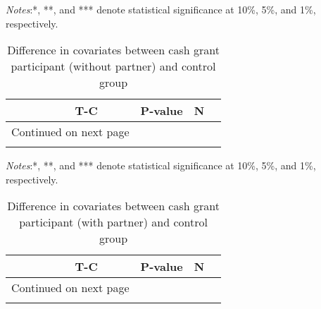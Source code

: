 \documentclass[10pt,a4paper]{article}
\begin{document}
\begin{center}
	{\tiny \tabcolsep=1pt  %
		\begin{ThreePartTable}
			\begin{TableNotes}[flushleft]
				\tiny
				\item \textit{Notes}:*, **, and *** denote statistical significance at 10\%, 5\%, and 1\%, respectively.
			\end{TableNotes}
			\begin{longtable}{l*{4}{c}}
				\caption{Difference in covariates between cash grant participant (without partner) and control group}\label{tab:balance_indiv_0}				\\
				\toprule
				\hline 
				&\multicolumn{1}{p{2cm}}{\centering T-C}
				&\multicolumn{1}{p{2cm}}{\centering P-value}
				&\multicolumn{1}{p{2cm}}{\centering N} \\
				\hline 
				\endfirsthead
				\hline
				\endhead
				\hline
				\multicolumn{2}{r}{{Continued on next page}} \\
				\endfoot
				
				\bottomrule
				\insertTableNotes
				\endlastfoot
				
			\end{longtable}
		\end{ThreePartTable}
	}
\end{center}

\begin{center}
	{\tiny \tabcolsep=1pt  %
		\begin{ThreePartTable}
			\begin{TableNotes}[flushleft]
				\tiny
				\item \textit{Notes}:*, **, and *** denote statistical significance at 10\%, 5\%, and 1\%, respectively.
			\end{TableNotes}
			\begin{longtable}{l*{4}{c}}
				\caption{Difference in covariates between cash grant participant (with partner) and control group}\label{tab:balance_indiv_1}					\\
				\toprule
				\hline 
				&\multicolumn{1}{p{2cm}}{\centering T-C}
				&\multicolumn{1}{p{2cm}}{\centering P-value}
				&\multicolumn{1}{p{2cm}}{\centering N} \\
				\hline 
				\endfirsthead
				\hline
				\endhead
				\hline
				\multicolumn{2}{r}{{Continued on next page}} \\
				\endfoot
				
				\bottomrule
				\insertTableNotes
				\endlastfoot
				
			\end{longtable}
		\end{ThreePartTable}
	}
\end{center}
\end{document}
